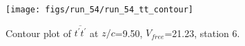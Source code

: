 \begin{figure}[H]
\centering
\texttt{[image: figs/run\_54/run\_54\_tt\_contour]}
\caption{Contour plot of $\overline{t^\prime t^\prime}$ at $z/c$=9.50, $V_{free}$=21.23, station 6.}
\label{fig:run_54_tt_contour}
\end{figure}


